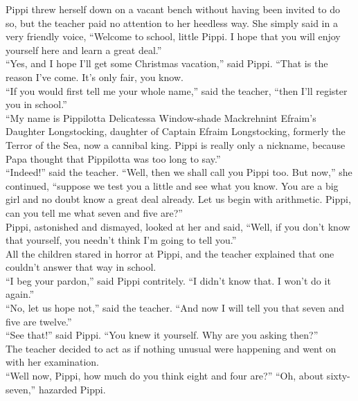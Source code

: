 \documentclass{standard}
\begin{document}
Pippi threw herself down on a vacant bench without having been invited to do so, but the teacher paid no attention to her heedless way. She simply said in a very friendly voice, “Welcome to school, little Pippi. I hope that you will enjoy yourself here and learn a great deal.”\\

“Yes, and I hope I’ll get some Christmas vacation,” said Pippi. “That is the reason I’ve come. It’s only fair, you know.\\

“If you would first tell me your whole name,” said the teacher, “then I’ll register you in school.”\\

“My name is Pippilotta Delicatessa Window-shade Mackrehnint Efraim’s Daughter Longstocking, daughter of Captain Efraim Longstocking, formerly the Terror of the Sea, now a cannibal king. Pippi is really only a nickname, because Papa thought that Pippilotta was too long to say.”\\

“Indeed!” said the teacher. “Well, then we shall call you Pippi too. But now,” she continued, “suppose we test you a little and see what you know. You are a big girl and no doubt know a great deal already. Let us begin with arithmetic. Pippi, can you tell me what seven and five are?”\\

Pippi, astonished and dismayed, looked at her and said, “Well, if you don’t know that yourself, you needn’t think I’m going to tell you.”\\

All the children stared in horror at Pippi, and the teacher explained that one couldn’t answer that way in school.\\

“I beg your pardon,” said Pippi contritely. “I didn’t know that. I won’t do it again.”\\

“No, let us hope not,” said the teacher. “And now I will tell you that seven and five are twelve.”\\

“See that!” said Pippi. ``You knew it yourself. Why are you asking then?”\\

The teacher decided to act as if nothing unusual were happening and went on with her examination.\\

“Well now, Pippi, how much do you think eight and four are?” “Oh, about sixty-seven,” hazarded Pippi.\\
\end{document}
